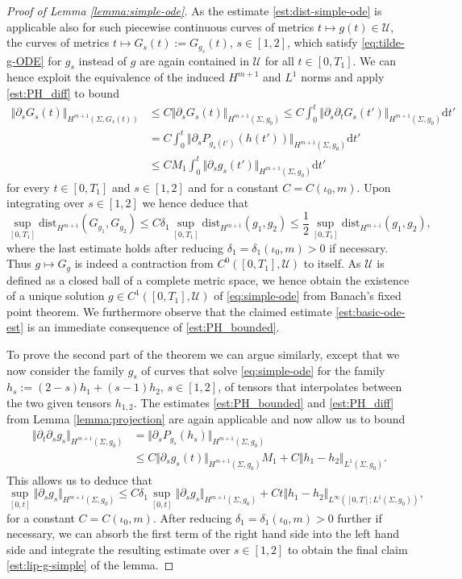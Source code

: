 \documentclass[10pt,reqno]{amsart}
\theoremstyle{plain}
\theoremstyle{definition}
\numberwithin{equation}{section}
\newcommand{\de}{\delta}
\newcommand{\Si}{\Sigma}
\newcommand{\norm}[1]{\Vert#1\Vert}
\newcommand{\beqas}{\begin{equation*}\begin{aligned}}
\newcommand{\eeqas}{\end{aligned}\end{equation*}}
\newcommand{\half}{\frac{1}{2}}
\newcommand{\dd}{\mathrm{d}} %
\newcommand{\pt}{\partial_t}
\newcommand{\ps}{\partial_s}
\newcommand{\dist}{\text{dist}}
\newcommand{\UU}{{\mathcal U}}
\begin{document}
\begin{proof}[Proof of Lemma \ref{lemma:simple-ode}]
    As the estimate \eqref{est:dist-simple-ode} is applicable also for such piecewise continuous curves of metrics $t\mapsto g(t)\in \UU$, the curves of metrics $t\mapsto G_s(t):=G_{g_s}(t)$, $s\in[1,2]$, which satisfy \eqref{eq:tilde-g-ODE} for $g_s$ instead of $g$ are again contained in $\UU$ for all $t\in [0,T_1]$. We can hence exploit the equivalence of the induced $H^{m+1}$ and $L^1$ norms and apply \eqref{est:PH_diff} to bound 
    \beqas
        \norm{\ps G_s(t)}_{H^{m+1}(\Si,G_s(t))}&\leq  C\norm{\ps G_s(t)}_{H^{m+1}(\Si,g_0)}\leq C\int_0^t \norm{\ps \pt G_s(t')}_{H^{m+1}(\Si,g_0)} \dd t'\\
        &=C\int_0^t \norm{\ps P_{g_s(t')}(h(t'))}_{H^{m+1}(\Si,g_0)} \dd t'\\
        &\leq CM_1\int_0^t\norm{\ps g_s(t')}_{H^{m+1}(\Si,g_0)}\dd t' 
    \eeqas
    for every $t\in [0,T_1]$ and $s\in [1,2]$ and for a constant $C=C(\iota_0,m)$. 
    Upon integrating over $s\in [1,2]$ we hence deduce that 
    $$\sup_{[0,T_1]} \dist_{H^{m+1}}(G_{g_1},G_{g_2})\leq
    C\de_1\sup_{[0,T_1]} \dist_{H^{m+1}}(g_1,g_2)\leq     
    \half  \sup_{[0,T_1]} \dist_{H^{m+1}}(g_1,g_2),$$
    where the last estimate holds 
    after reducing $\de_1=\de_1(\iota_0,m)>0$ if necessary. Thus $g\mapsto G_g$ is indeed a contraction from $C^0([0,T_1],\UU)$ to itself. As $\UU$ is defined as a closed ball of a complete metric space, we hence obtain the existence of a unique solution $g\in C^1([0,T_1],\UU)$ of \eqref{eq:simple-ode} from Banach's fixed point theorem. We furthermore observe that the claimed estimate \eqref{est:basic-ode-est} is an immediate consequence of \eqref{est:PH_bounded}. 

    To prove the second part of the theorem we can argue similarly, except that we now consider the family $g_s$ of curves that solve \eqref{eq:simple-ode} for the family $h_s:=(2-s) h_1+(s-1)h_2$, $s\in [1,2]$, of tensors that interpolates between the two given tensors  $h_{1,2}$. The estimates \eqref{est:PH_bounded} and \eqref{est:PH_diff} from Lemma \ref{lemma:projection} are again applicable and now allow us to bound 
    \beqas
        \norm{\partial_t \partial_s g_s}_{H^{m+1}(\Si,g_0)} &= \norm{\partial_s P_{g_s}(h_s)}_{H^{m+1}(\Si,g_0)}\\
        &\leq C \norm{\partial_s g_s(t)}_{H^{m+1}(\Si,g_0)} M_1+C\norm{h_1-h_2}_{L^1(\Si,g_0)}.
    \eeqas
    This allows us to deduce that 
    $$\sup_{[0,t]}\norm{\ps g_s}_{H^{m+1}(\Si,g_0)}\leq C  \de_1\sup_{[0,t]}\norm{\ps g_s}_{H^{m+1}(\Si,g_0)}+Ct\norm{h_1-h_2}_{L^\infty([0,T];L^1(\Si,g_0))},$$
    for a constant $C=C(\iota_0,m)$. After reducing $\de_1 = \de_1(\iota_0,m) > 0$ further if necessary, we can absorb the first term of the right hand side into the left hand side and integrate the resulting estimate over $s\in [1,2]$ to obtain the final claim \eqref{est:lip-g-simple} of the lemma. 
\end{proof}
\end{document}
